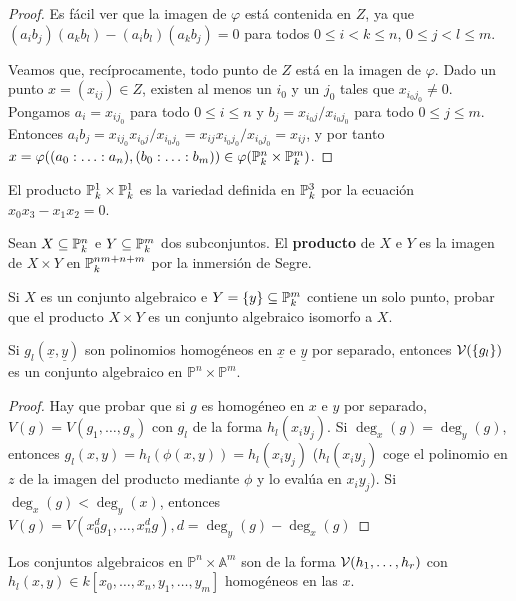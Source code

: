 \documentclass[ACGA.tex]{subfiles}
\begin{document}
\begin{proof}
 Es fácil ver que la imagen de $\varphi$ está contenida en $Z$, ya que $(a_ib_j)(a_kb_l)-(a_ib_l)(a_kb_j)=0$ para todos $0\leq i<k\leq n$, $0\leq j<l\leq m$. 

Veamos que, recíprocamente, todo punto de $Z$ está en la imagen de $\varphi$. Dado un punto $x=(x_{ij})\in Z$, existen al menos un $i_0$ y un $j_0$ tales que $x_{i_0j_0}\neq 0$. Pongamos $a_i=x_{ij_0}$ para todo $0\leq i\leq n$ y $b_j=x_{i_0j}/x_{i_0j_0}$ para todo $0\leq j\leq m$. Entonces $a_ib_j=x_{ij_0}x_{i_0j}/x_{i_0j_0}=x_{ij}x_{i_0j_0}/x_{i_0j_0}=x_{ij}$, y por tanto $x=\varphi((a_0:\ldots:a_n),(b_0:\ldots:b_m))\in\varphi(\mathbb{P}^n_k\times\mathbb{P}^m_k)$.
\end{proof}

\begin{ej}
 El producto $\mathbb{P}^1_k\times\mathbb{P}^1_k$ es la variedad definida en $\mathbb{P}^3_k$ por la ecuación $x_0x_3-x_1x_2=0$.
\end{ej}

\begin{defi} Sean $X\subseteq\mathbb{P}^n_k$ e $Y\subseteq\mathbb{P}^m_k$ dos subconjuntos. El {\bf producto} de $X$ e $Y$ es la imagen de $X\times Y$ en $\mathbb{P}^{nm+n+m}_k$ por la inmersión de Segre.
 \end{defi}

\begin{ejer}\label{productoporpunto}
 Si $X$ es un conjunto algebraico e $Y=\{y\}\subseteq\mathbb{P}^m_k$ contiene un solo punto, probar que el producto $X\times Y$ es un conjunto algebraico isomorfo a $X$.
\end{ejer}

\begin{prop}
Si $g_l(\underline{x},\underline{y})$ son polinomios homogéneos en $\underline{x}$ e $\underline{y}$ por separado, entonces $\mathcal{V}(\{g_l\})$ es un conjunto algebraico en $\mathbb{P}^n\times\mathbb{P}^m$. 
\end{prop}
\begin{proof}
Hay que probar que si $g$ es homogéneo en $x$ e $y$ por separado, $V(g)=V(g_1,\dots,g_s)$ con $g_l$ de la forma $h_l(x_iy_j)$. Si $\deg_x(g)=\deg_y(g)$, entonces $g_l(x,y)=h_l(\phi(x,y))=h_l(x_iy_j)$ ($h_l(x_iy_j)$ coge el polinomio en $z$ de la imagen del producto mediante $\phi$ y lo evalúa en $x_iy_j$). Si $\deg_x(g)<\deg_y(x)$, entonces $V(g)=V(x_0^dg_1,\dots, x_n^dg), d=\deg_y(g)-\deg_x(g)$
\end{proof}

Los conjuntos algebraicos en $\mathbb{P}^n\times\mathbb{A}^m$ son de la forma $\mathcal{V}(h_1,\dots,h_r)$ con $h_l(x,y)\in k[x_0,\dots, x_n,y_1,\dots, y_m]$ homogéneos en las $x$. 
\end{document}
